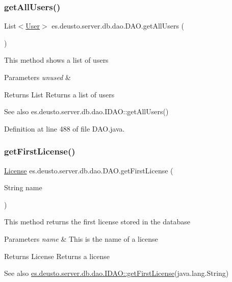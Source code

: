 \subsubsection{\texorpdfstring{get\+All\+Users()}{getAllUsers()}}
{\footnotesize\ttfamily List$<$\hyperlink{classes_1_1deusto_1_1server_1_1db_1_1data_1_1_user}{User}$>$ es.\+deusto.\+server.\+db.\+dao.\+D\+A\+O.\+get\+All\+Users (\begin{DoxyParamCaption}{ }\end{DoxyParamCaption})}

This method shows a list of users 
\begin{DoxyParams}{Parameters}
{\em unused} & \\
\hline
\end{DoxyParams}
\begin{DoxyReturn}{Returns}
List Returns a list of users 
\end{DoxyReturn}
\begin{DoxySeeAlso}{See also}
es.\+deusto.\+server.\+db.\+dao.\+I\+D\+A\+O\+::get\+All\+Users() 
\end{DoxySeeAlso}


Definition at line 488 of file D\+A\+O.\+java.

\mbox{\label{classes_1_1deusto_1_1server_1_1db_1_1dao_1_1_d_a_o_a4a5a54059bac00ea6f3b6d21f2a31a02}} 
\subsubsection{\texorpdfstring{get\+First\+License()}{getFirstLicense()}}
{\footnotesize\ttfamily \hyperlink{classes_1_1deusto_1_1server_1_1db_1_1data_1_1_license}{License} es.\+deusto.\+server.\+db.\+dao.\+D\+A\+O.\+get\+First\+License (\begin{DoxyParamCaption}\item[{String}]{name }\end{DoxyParamCaption})}

This method returns the first license stored in the database 
\begin{DoxyParams}{Parameters}
{\em name} & This is the name of a license \\
\hline
\end{DoxyParams}
\begin{DoxyReturn}{Returns}
License Returns a license 
\end{DoxyReturn}
\begin{DoxySeeAlso}{See also}
\hyperlink{interfacees_1_1deusto_1_1server_1_1db_1_1dao_1_1_i_d_a_o_aef2783889a572e23bd57c5a2a955599a}{es.\+deusto.\+server.\+db.\+dao.\+I\+D\+A\+O\+::get\+First\+License}(java.\+lang.\+String) 
\end{DoxySeeAlso}


